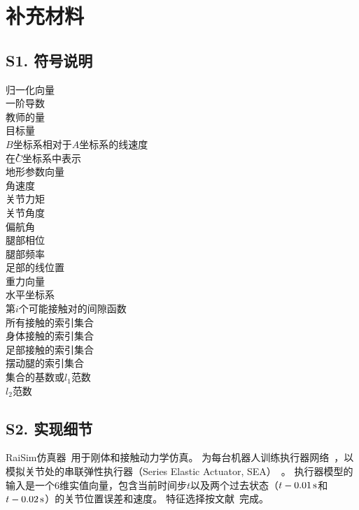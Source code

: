 \documentclass[9pt,twocolumn,twoside]{osajnl}
\begin{document}
\setcounter{algorithm}{0}
\makeatletter
\renewcommand{\thealgorithm}{S\@arabic\c@algorithm}
\makeatother



\section*{补充材料}
\subsection*{S1. 符号说明}
\makebox[1.2cm]{$\hat{(\cdot)}$} 归一化向量\\
\makebox[1.2cm]{$\dot{(\cdot)}$} 一阶导数\\
\makebox[1.2cm]{$\bar{(\cdot)}$} 教师的量\\
 目标量\\
 $B$坐标系相对于$A$坐标系的线速度\\
\makebox[1.2cm]{}\. 在$C$坐标系中表示\\
 地形参数向量\\
\makebox[1.2cm]{$\omega$} 角速度\\
\makebox[1.2cm]{$\tau$} 关节力矩\\
\makebox[1.2cm]{$\theta$} 关节角度\\
\makebox[1.2cm]{$\psi$} 偏航角\\
\makebox[1.2cm]{$\phi$} 腿部相位\\
 腿部频率\\
 足部的线位置\\
 重力向量\\
 水平坐标系\\
 第$i$个可能接触对的间隙函数\\
 所有接触的索引集合\\
 身体接触的索引集合\\
 足部接触的索引集合\\
 摆动腿的索引集合\\
\makebox[1.2cm]{$\lvert \cdot \rvert$} 集合的基数或$l_1$范数\\
\makebox[1.2cm]{$\lvert\lvert \cdot \rvert\rvert$} $l_2$范数\\

\subsection*{S2. 实现细节}\label{impl_details}
RaiSim仿真器~\cite{hwangbo2018per}用于刚体和接触动力学仿真。
为每台机器人训练执行器网络~\cite{hwangbo2019learning}，以模拟关节处的串联弹性执行器（Series Elastic Actuator, SEA）~\cite{pratt1995series}。
执行器模型的输入是一个6维实值向量，包含当前时间步$t$以及两个过去状态（$t - \unit[0.01]{s}$和$t - \unit[0.02]{s}$）的关节位置误差和速度。
特征选择按文献~\cite{hwangbo2019learning}完成。
\end{document}
